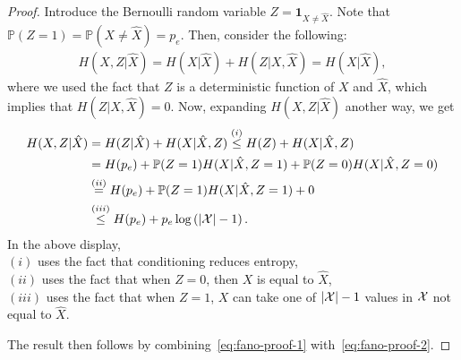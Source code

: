             \begin{proof}
                Introduce the Bernoulli random variable $Z = \boldsymbol{1}_{X \neq \hat{X}}$. Note that $\mathbb{P}(Z=1) = \mathbb{P}(X \neq \hat{X}) = p_e$. Then, consider the following: 
                \begin{align}
                    H(X, Z|\hat{X}) = H(X|\hat{X}) + H(Z|X, \hat{X}) = H(X|\hat{X}),  \label{eq:fano-proof-1}
                \end{align}
                where we used the fact that $Z$ is a deterministic function of $X$ and $\hat{X}$, which implies that $H(Z|X, \hat{X}) = 0$. Now, expanding $H(X, Z|\hat{X})$ another way, we get 
                \begin{align}
                    H(X, Z|\hat{X}) &= H(Z|\hat{X}) + H(X|\hat{X}, Z) \stackrel{(i)}{\leq} H(Z) + H(X|\hat{X}, Z) \\
                    & =  H(p_e) + \mathbb{P}(Z=1) H(X|\hat{X}, Z=1) + \mathbb{P}(Z=0) H(X|\hat{X}, Z=0)\\
                    & \stackrel{(ii)}{=}   H(p_e) + \mathbb{P}(Z=1) H(X|\hat{X}, Z=1) + 0\\
                    &  \stackrel{(iii)}{\leq}  H(p_e) + p_e \log\left( |\mathcal{X}|-1\right). \label{eq:fano-proof-2}
                \end{align}
                In the above display, \\
                $(i)$ uses the fact that conditioning reduces entropy, \\ 
                $(ii)$ uses the fact that when $Z=0$, then $X$ is equal to $\hat{X}$, \\
                $(iii)$ uses the fact that when $Z=1$, $X$ can take one of $|\mathcal{X}|-1$ values in $\mathcal{X}$ not equal to $\hat{X}$. 
                
                
                The result then follows by combining~\eqref{eq:fano-proof-1} with~\eqref{eq:fano-proof-2}. 
            \end{proof}

